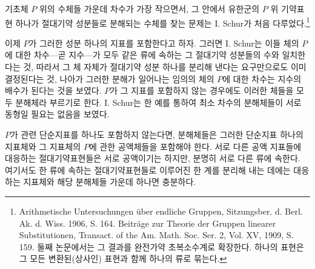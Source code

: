 \documentclass[11pt]{article}
\begin{document}
기초체 $P$ 위의 수체들 가운데 차수가 가장 작으면서, 그 안에서 유한군의 $P$ 위 기약표현 하나가 절대기약 성분들로 분해되는 수체를 찾는 문제는 I. Schur가 처음 다루었다.\footnote{Arithmetische Untersuchungen über endliche Gruppen, Sitzungsber. d. Berl. Ak. d. Wiss. 1906, S. 164. Beiträge zur Theorie der Gruppen linearer Substitutionen, Transact. of the Am. Math. Soc. Ser. 2, Vol. XV, 1909, S. 159. 둘째 논문에서는 그 결과를 완전가약 초복소수계로 확장한다. 하나의 표현은 그 모든 변환된(상사인) 표현과 함께 하나의 류로 묶는다.}

이제 $P$가 그러한 성분 하나의 지표를 포함한다고 하자. 그러면 I. Schur는 이들 체의 $P$에 대한 차수---곧 지수---가 모두 같은 류에 속하는 그 절대기약 성분들의 수와 일치한다는 것, 따라서 그 체 자체가 절대기약 성분 하나를 분리해 낸다는 요구만으로도 이미 결정된다는 것, 나아가 그러한 분해가 일어나는 임의의 체의 $P$에 대한 차수는 지수의 배수가 된다는 것을 보였다. $P$가 그 지표를 포함하지 않는 경우에도 이러한 체들을 모두 분해체라 부르기로 한다. I. Schur는 한 예를 통하여 최소 차수의 분해체들이 서로 동형일 필요는 없음을 보였다.

$P$가 관련 단순지표를 하나도 포함하지 않는다면, 분해체들은 그러한 단순지표 하나의 지표체와 그 지표체의 $P$에 관한 공액체들을 포함해야 한다. 서로 다른 공액 지표들에 대응하는 절대기약표현들은 서로 공액이기는 하지만, 분명히 서로 다른 류에 속한다. 여기서도 한 류에 속하는 절대기약표현들로 이루어진 한 계를 분리해 내는 데에는 대응하는 지표체와 해당 분해체들 가운데 하나면 충분하다.
\end{document}
